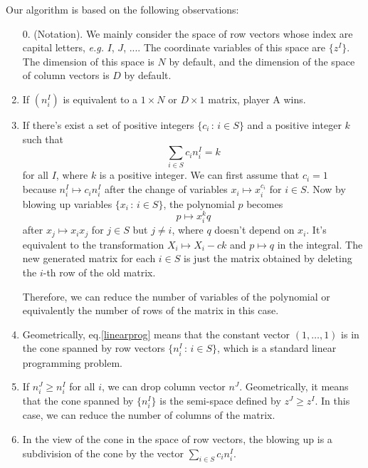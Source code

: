 \documentclass[12pt]{article}
\theoremstyle{definition}
\theoremstyle{plain}
\begin{document}
Our algorithm is based on the following observations:
\begin{enumerate}
	\item[0.](Notation). We mainly consider the space of row vectors whose index are capital letters,
		\textit{e.g.} $I$, $J$, .... The coordinate variables of this space are $\{z^I\}$.
		The dimension of this space is $N$ by default, and the dimension of the space
		of column vectors is $D$ by default.
	\item If $(n^I_i)$ is equivalent to a $1\times N$ or $D\times 1$ matrix, player A wins. 
	\item If there's exist a set of positive integers $\{c_i\,:\,i\in S\}$ and a 
	positive integer $k$ such that
	\begin{equation}\label{linearprog}
		\sum_{i\in S} c_i n^I_i = k
	\end{equation}	
	for all $I$, where $k$ is a positive integer. 
	We can first assume that $c_i=1$ because $n^I_i\mapsto c_i n^I_i$ after the 
	change of variables $x_i\mapsto x_i^{c_i}$ for $i\in S$.
	Now by blowing up variables $\{x_i\,:\, i\in S\}$, the polynomial $p$ becomes
	\[
		p\mapsto x_i^k q
	\]
	after $x_j\mapsto x_ix_j$ for $j\in S$ but $j\neq i$, where $q$ doesn't depend on $x_i$.
	It's equivalent to the transformation $X_i\mapsto X_i-ck$ and $p\mapsto q$ 
	in the integral. The new generated matrix for each $i\in S$ is just the matrix
	obtained by deleting the $i$-th row of the old matrix.
	
	Therefore, we can reduce the number of variables of the polynomial or equivalently 
	the number of rows of the matrix in this case.

	\item Geometrically, eq.\eqref{linearprog} means that the constant vector $(1,\dots,1)$ 
	is in the cone spanned by row vectors $\{n_i^I\,:\,i\in S\}$, which is a standard linear 
	programming problem. 

	\item If $n^J_i \geq n^I_i$ for all $i$, we can drop column vector $n^J$. Geometrically, 
	it means that the cone spanned by $\{n^I_i\}$ is the semi-space defined by $z^J\geq z^I$.
	In this case, we can reduce the number of columns of the matrix.
	
	\item In the view of the cone in the space of row vectors, 
		the blowing up is a subdivision of the cone by the 
		vector $\sum_{i\in S} c_i n^I_i$.
	\begin{center}
\end{center}
\end{enumerate}
\end{document}
